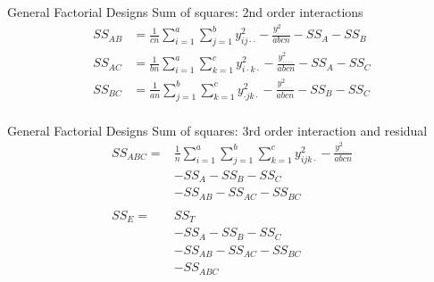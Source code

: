 \documentclass[t]{beamer}
\begin{document}

\begin{ftst}
{General Factorial Designs}
{Sum of squares: 2nd order interactions}
\begin{align*}
SS_{AB} &=\frac{1}{cn}\sum\limits_{i=1}^{a}\sum\limits_{j=1}^{b}{y_{ij\cdot\cdot}^2} - \frac{y_{\cdot\cdot\cdot\cdot}^2}{abcn} -SS_A-SS_B\\
SS_{AC} &=\frac{1}{bn}\sum\limits_{i=1}^{a}\sum\limits_{k=1}^{c}{y_{i\cdot k\cdot}^2} - \frac{y_{\cdot\cdot\cdot\cdot}^2}{abcn} -SS_A-SS_C\\
SS_{BC} &=\frac{1}{an}\sum\limits_{j=1}^{b}\sum\limits_{k=1}^{c}{y_{\cdot jk\cdot}^2} - \frac{y_{\cdot\cdot\cdot\cdot}^2}{abcn} -SS_B-SS_C\\
\end{align*}
\end{ftst}


\begin{ftst}
{General Factorial Designs}
{Sum of squares: 3rd order interaction and residual}
\begin{align*}
SS_{ABC} = &\frac{1}{n}\sum\limits_{i=1}^{a}\sum\limits_{j=1}^{b}\sum\limits_{k=1}^{c}{y_{ijk\cdot}^2} - \frac{y_{\cdot\cdot\cdot\cdot}^2}{abcn}\\
&-SS_A -SS_B -SS_C\\&- SS_{AB} -SS_{AC} -SS_{BC}\\
& \\
SS_{E} = &SS_T \\&-SS_A -SS_B -SS_C\\&- SS_{AB} -SS_{AC} -SS_{BC}\\&-SS_{ABC}
\end{align*}
\end{ftst}

\end{document}

